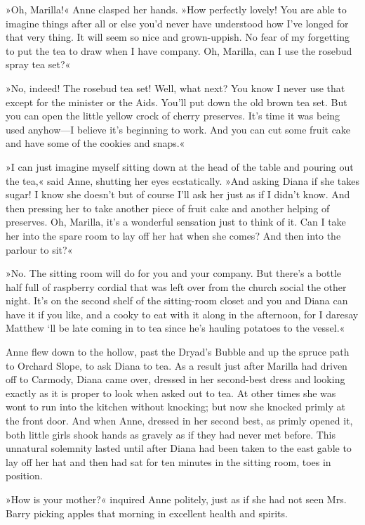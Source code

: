 »Oh, Marilla!« Anne clasped her hands. »How perfectly lovely! You are able to imagine things after all or else you’d never have understood how I’ve longed for that very thing. It will seem so nice and grown-uppish. No fear of my forgetting to put the tea to draw when I have company. Oh, Marilla, can I use the rosebud spray tea set?«

»No, indeed! The rosebud tea set! Well, what next? You know I never use that except for the minister or the Aids. You’ll put down the old brown tea set. But you can open the little yellow crock of cherry preserves. It’s time it was being used anyhow—I believe it’s beginning to work. And you can cut some fruit cake and have some of the cookies and snaps.«

»I can just imagine myself sitting down at the head of the table and pouring out the tea,« said Anne, shutting her eyes ecstatically. »And asking Diana if she takes sugar! I know she doesn’t but of course I’ll ask her just as if I didn’t know. And then pressing her to take another piece of fruit cake and another helping of preserves. Oh, Marilla, it’s a wonderful sensation just to think of it. Can I take her into the spare room to lay off her hat when she comes? And then into the parlour to sit?«

»No. The sitting room will do for you and your company. But there’s a bottle half full of raspberry cordial that was left over from the church social the other night. It’s on the second shelf of the sitting-room closet and you and Diana can have it if you like, and a cooky to eat with it along in the afternoon, for I daresay Matthew `ll be late coming in to tea since he's hauling potatoes to the vessel.«

Anne flew down to the hollow, past the Dryad’s Bubble and up the spruce path to Orchard Slope, to ask Diana to tea. As a result just after Marilla had driven off to Carmody, Diana came over, dressed in her second-best dress and looking exactly as it is proper to look when asked out to tea. At other times she was wont to run into the kitchen without knocking; but now she knocked primly at the front door. And when Anne, dressed in her second best, as primly opened it, both little girls shook hands as gravely as if they had never met before. This unnatural solemnity lasted until after Diana had been taken to the east gable to lay off her hat and then had sat for ten minutes in the sitting room, toes in position.

»How is your mother?« inquired Anne politely, just as if she had not seen Mrs. Barry picking apples that morning in excellent health and spirits.

